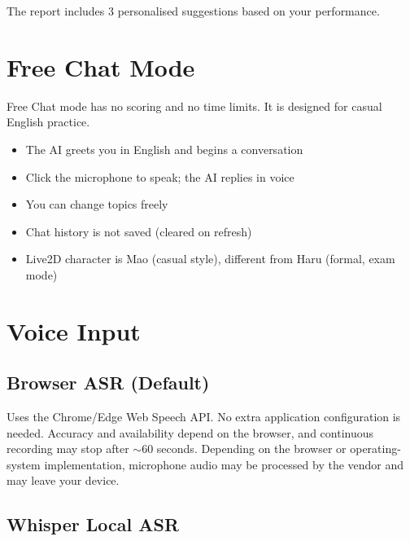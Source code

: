 \documentclass[12pt,a4paper]{article}
\begin{document}
The report includes 3 personalised suggestions based on your performance.

\vspace{8pt}
\begin{center}
\end{center}

\newpage

\section{Free Chat Mode}

Free Chat mode has no scoring and no time limits. It is designed for casual English practice.

\begin{itemize}[leftmargin=*]
  \item The AI greets you in English and begins a conversation
  \item Click the microphone to speak; the AI replies in voice
  \item You can change topics freely
  \item Chat history is not saved (cleared on refresh)
  \item Live2D character is Mao (casual style), different from Haru (formal, exam mode)
\end{itemize}

\section{Voice Input}

\subsection{Browser ASR (Default)}

Uses the Chrome/Edge Web Speech API. No extra application configuration is needed. Accuracy and availability depend on the browser, and continuous recording may stop after $\sim$60 seconds. Depending on the browser or operating-system implementation, microphone audio may be processed by the vendor and may leave your device.

\subsection{Whisper Local ASR}
\end{document}
